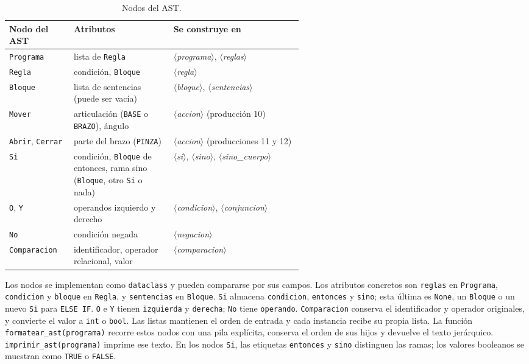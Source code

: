 \documentclass[10pt,a4paper]{article}
\newcommand{\nt}[1]{\ensuremath{\langle}\textit{#1}\ensuremath{\rangle}}   %
\newcommand{\tm}[1]{\texttt{#1}}                                          %
\begin{document}
\begin{table}[H]
\centering\small
\begin{tabularx}{\linewidth}{|L{0.22\linewidth}|L{0.34\linewidth}|X|}
\hline
\textbf{Nodo del AST} & \textbf{Atributos} & \textbf{Se construye en} \\
\hline
\tm{Programa} & lista de \tm{Regla} & \nt{programa}, \nt{reglas} \\
\hline
\tm{Regla} & condición, \tm{Bloque} & \nt{regla} \\
\hline
\tm{Bloque} & lista de sentencias (puede ser vacía) & \nt{bloque}, \nt{sentencias} \\
\hline
\tm{Mover} & articulación (\tm{BASE} o \tm{BRAZO}), ángulo & \nt{accion} (producción 10) \\
\hline
\tm{Abrir}, \tm{Cerrar} & parte del brazo (\tm{PINZA}) & \nt{accion} (producciones 11 y 12) \\
\hline
\tm{Si} & condición, \tm{Bloque} de entonces, rama sino (\tm{Bloque}, otro \tm{Si} o nada) & \nt{si}, \nt{sino}, \nt{sino\_cuerpo} \\
\hline
\tm{O}, \tm{Y} & operandos izquierdo y derecho & \nt{condicion}, \nt{conjuncion} \\
\hline
\tm{No} & condición negada & \nt{negacion} \\
\hline
\tm{Comparacion} & identificador, operador relacional, valor & \nt{comparacion} \\
\hline
\end{tabularx}
\caption{Nodos del AST.}
\label{tab:ast}
\end{table}

Los nodos se implementan como \tm{dataclass} y pueden compararse por sus campos. Los atributos concretos son \tm{reglas} en \tm{Programa}, \tm{condicion} y \tm{bloque} en \tm{Regla}, y \tm{sentencias} en \tm{Bloque}. \tm{Si} almacena \tm{condicion}, \tm{entonces} y \tm{sino}; esta última es \tm{None}, un \tm{Bloque} o un nuevo \tm{Si} para \tm{ELSE IF}. \tm{O} e \tm{Y} tienen \tm{izquierda} y \tm{derecha}; \tm{No} tiene \tm{operando}. \tm{Comparacion} conserva el identificador y operador originales, y convierte el valor a \tm{int} o \tm{bool}. Las listas mantienen el orden de entrada y cada instancia recibe su propia lista. La función \tm{formatear\_ast(programa)} recorre estos nodos con una pila explícita, conserva el orden de sus hijos y devuelve el texto jerárquico. \tm{imprimir\_ast(programa)} imprime ese texto. En los nodos \tm{Si}, las etiquetas \tm{entonces} y \tm{sino} distinguen las ramas; los valores booleanos se muestran como \tm{TRUE} o \tm{FALSE}.
\end{document}
